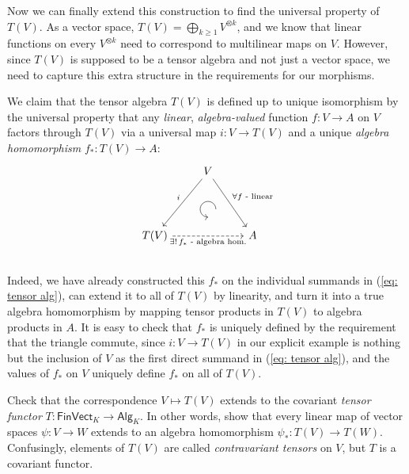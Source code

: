 \documentclass[english,letterpaper]{article}%
\numberwithin{equation}{section}
\numberwithin{figure}{section}
\numberwithin{table}{section}
\theoremstyle{definition}
\theoremstyle{definition}
\theoremstyle{definition}
\theoremstyle{plain}
\theoremstyle{plain}
\theoremstyle{plain}
\theoremstyle{plain}
\theoremstyle{remark}
\theoremstyle{remark}
\renewcommand{\geq}{\geqslant}
\begin{document}
\begin{example}
Now we can finally extend this construction to find the universal property of $T\left(V\right)$. As a vector space, $T(V)=\bigoplus_{k\geq 1}V^{\otimes k}$, and we know that linear functions on every $V^{\otimes k}$ need to correspond to multilinear maps on $V$. However, since $T(V)$ is supposed to be a tensor algebra and not just a vector space, we need to capture this extra structure in the requirements for our morphisms.

We claim that the tensor algebra $T(V)$ is defined up to unique isomorphism by the universal property that any \emph{linear}, \emph{algebra-valued} function $f:V\to A$ on $V$ factors through $T(V)$ via a universal map $i:V\to T(V)$ and a unique \emph{algebra homomorphism} $f_{\ast}:T(V)\to A$:
\[\begin{tikzcd}[every matrix/.append style={name=m},   
execute at end picture={\draw [<-] ([xshift=0mm,yshift=-6mm]m-2-2.north) arc[start angle=-90,delta angle=-270,radius=0.25cm];}]
   & V\arrow[ddl,swap,"i" ]\arrow[ddr,"\forall f\text{ - linear}"] & \\
   & \, & \\
   T(V) \arrow[rr,dashed,swap,"\exists!\,f_\ast\text{ - algebra hom.}"]& & A\\
\end{tikzcd}\]
Indeed, we have already constructed this $f_{\ast}$ on the individual
summands in (\ref{eq: tensor alg}), can extend it to all of $T(V)$
by linearity, and turn it into a true algebra homomorphism by mapping
tensor products in $T(V)$ to algebra products in $A$. It is easy
to check that $f_{\ast}$ is uniquely defined by the requirement that
the triangle commute, since $i:V\to T(V)$ in our explicit example
is nothing but the inclusion of $V$ as the first direct summand in
(\ref{eq: tensor alg}), and the values of $f_{\ast}$ on $V$ uniquely
define $f_{\ast}$ on all of $T(V)$.
\end{example}
\begin{xca}
Check that the correspondence $V\mapsto T(V)$ extends to the covariant
\emph{tensor functor} $T:\mathsf{FinVect}_{K}\to\mathsf{Alg}_{K}$.
In other words, show that every linear map of vector spaces $\psi:V\to W$
extends to an algebra homomorphism $\psi_{\ast}:T(V)\to T(W)$. Confusingly,
elements of $T(V)$ are called \emph{contravariant tensors} on $V$,
but $T$ is a covariant functor.
\end{xca}
\end{document}
